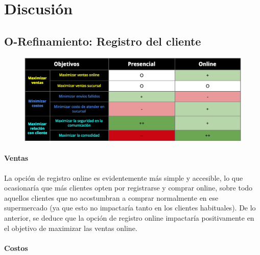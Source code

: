 \section{Discusión}


\subsection{O-Refinamiento: Registro del cliente}
\begin{figure}[ht]
  \includegraphics[width=\linewidth]{tp1/images/objetivo-blando-registro-cliente.png}
\end{figure}

\paragraph{Ventas}

La opción de registro online es evidentemente más simple y accesible, lo que
ocasionaría que más clientes opten por registrarse y comprar online, sobre todo
aquellos clientes que no acostumbran a comprar normalmente en ese supermercado
(ya que esto no impactaría tanto en los clientes habituales). De lo anterior, se
deduce que la opción de registro online impactaría positivamente en el objetivo
de maximizar las ventas online.

\paragraph{Costos}

